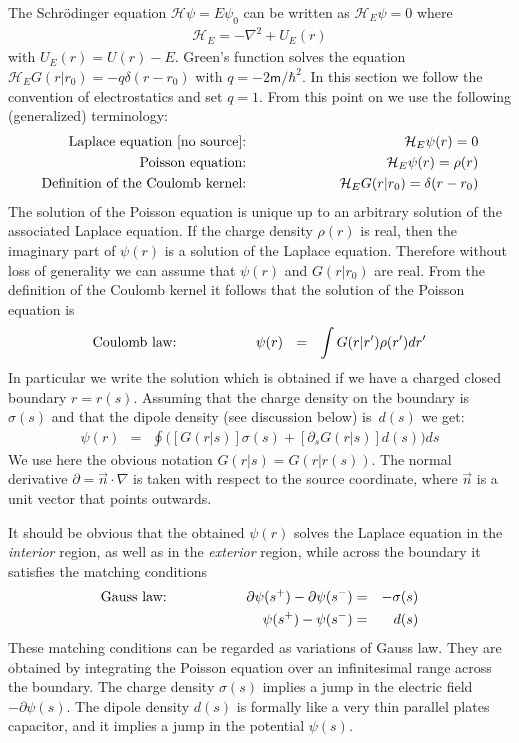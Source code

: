 \documentclass[onecolumn,fleqn, 11pt]{revtex4}
\newcommand{\mass}{\mathsf{m}}
\newcommand{\beq}{\begin{eqnarray}}
\newcommand{\eeq}{\end{eqnarray}}
\begin{document}
The Schr\"{o}dinger equation $\mathcal{H}\psi=E\psi_0$ can be 
written as $\mathcal{H}_E\psi=0$ where 
\beq
\mathcal{H}_E=-\nabla^2 + U_E(r) 
\eeq
with $U_E(r)=U(r)-E$. Green's function solves 
the equation $\mathcal{H}_E G(r|r_0)=-q\delta(r-r_0)$ 
with $q=-2\mass/\hbar^2$. In this section we follow the convention 
of electrostatics and set $q=1$. From this point on we use 
the following (generalized) terminology:
\beq
\mbox{Laplace equation [no source]:} 
\hspace*{2cm} &&
\mathcal{H}_E \psi(r) = 0
\\
\mbox{Poisson equation:} 
\hspace*{2cm} &&
\mathcal{H}_E \psi(r) = \rho(r)
\\
\mbox{Definition of the Coulomb kernel:}
\hspace*{2cm} &&
\mathcal{H}_E G(r|r_0)=\delta(r-r_0) 
\eeq
The solution of the Poisson equation is unique 
up to an arbitrary solution of the associated Laplace equation.  
If the charge density $\rho(r)$ is real, 
then the imaginary part of $\psi(r)$ is a solution 
of the Laplace equation. Therefore without loss of generality we 
can assume that $\psi(r)$ and $G(r|r_0)$ are real. 
From the definition of the Coulomb kernel it follows 
that the solution of the Poisson equation is 
\beq
\mbox{Coulomb law:}
\hspace*{2cm}
\psi(r) \ \ = \ \ \int G(r|r') \rho(r') dr'
\eeq
In particular we write the solution which is obtained 
if we have a charged closed boundary ${r=r(s)}$. 
Assuming that the charge density on the boundary   
is~$\sigma(s)$ and that the dipole density 
(see discussion below) is~$d(s)$ we get:
\beq
\psi(r) \ \ = \ \ 
\oint \Big( [G(r|s)] \sigma(s) + [\partial_s G(r|s)] d(s) \Big) ds
\eeq
We use here the obvious notation ${G(r|s)=G(r|r(s))}$.  
The normal derivative ${\partial=\vec{n}\cdot\nabla}$ 
is taken with respect to the source coordinate,  
where $\vec{n}$ is a unit vector that points outwards.



It should be obvious that the obtained $\psi(r)$ solves 
the Laplace equation in the {\em interior} region, 
as well as in the {\em exterior} region, 
while across the boundary it satisfies the matching conditions    
\beq
\mbox{Gauss law:} 
\hspace*{2cm} 
\partial\psi(s^{+})-\partial\psi(s^{-}) &=& -\sigma(s)
\\
\psi(s^{+}) - \psi(s^{-}) &=& d(s)
\eeq
These matching conditions can be regarded 
as variations of Gauss law. They are obtained 
by integrating the Poisson equation 
over an infinitesimal range across the boundary.  
The charge density  $\sigma(s)$ implies 
a jump in the electric field $-\partial\psi(s)$.
The dipole density $d(s)$ is formally like a very 
thin parallel plates capacitor, and it implies 
a jump in the potential $\psi(s)$. 
\end{document}
